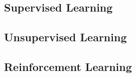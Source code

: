 \subsection{Supervised Learning}

\subsection{Unsupervised Learning}

\subsection{Reinforcement Learning}